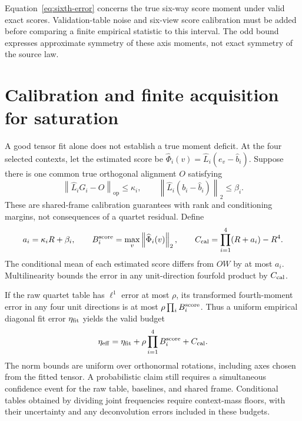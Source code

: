 \documentclass[11pt]{article}
\theoremstyle{definition}
\theoremstyle{remark}
\newcommand{\op}{\mathrm{op}}
\newcommand{\norm}[1]{\left\lVert#1\right\rVert}
\begin{document}
Equation~\eqref{eq:sixth-error} concerns the true six-way score moment
under valid exact scores. Validation-table noise and six-view score
calibration must be added before comparing a finite empirical statistic
to this interval. The odd bound expresses approximate symmetry of these
axis moments, not exact symmetry of the source law.

\section{Calibration and finite acquisition for saturation}
\label{sec:calibration}

A good tensor fit alone does not establish a true moment deficit. At the
four selected contexts, let the estimated score be
$\widehat\Phi_i(v)=\widehat L_i(e_v-\widehat b_i)$. Suppose there is one
common true orthogonal alignment $O$ satisfying
\begin{equation}
\norm{\widehat L_iG_i-O}_{\op}\le\kappa_i,
\qquad
\norm{\widehat L_i(b_i-\widehat b_i)}_2\le\beta_i.
\label{eq:calibration-assumptions}
\end{equation}
These are shared-frame calibration guarantees with rank and conditioning
margins, not consequences of a quartet residual. Define
\begin{equation}
a_i=\kappa_iR+\beta_i,
\qquad
B_i^{\rm score}=\max_v\norm{\widehat\Phi_i(v)}_2,
\qquad
C_{\rm cal}=\prod_{i=1}^4(R+a_i)-R^4.
\label{eq:calibration-constants}
\end{equation}
The conditional mean of each estimated score differs from $OW$ by at
most $a_i$. Multilinearity bounds the error in any unit-direction
fourfold product by $C_{\rm cal}$.

If the raw quartet table has $\ell^1$ error at most $\rho$, its transformed
fourth-moment error in any four unit directions is at most
$\rho\prod_i B_i^{\rm score}$. Thus a uniform empirical diagonal fit
error $\eta_{\rm fit}$ yields the valid budget
\begin{equation}
\eta_{\rm eff}=\eta_{\rm fit}
+\rho\prod_{i=1}^4B_i^{\rm score}
+C_{\rm cal}.
\label{eq:eta-effective}
\end{equation}
The norm bounds are uniform over orthonormal rotations, including axes
chosen from the fitted tensor. A probabilistic claim still requires a
simultaneous confidence event for the raw table, baselines, and shared
frame. Conditional tables obtained by dividing joint frequencies require
context-mass floors, with their uncertainty and any deconvolution errors
included in these budgets.
\end{document}
